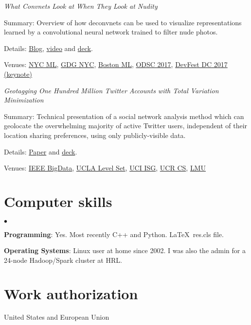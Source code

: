 \documentclass[margin,line]{res}
\newenvironment{list1}{
  \begin{list}{\ding{113}}{%
      \setlength{\itemsep}{0.0in}
      \setlength{\parsep}{0in} \setlength{\parskip}{0in}
      \setlength{\topsep}{0in} \setlength{\partopsep}{0in}
      \setlength{\leftmargin}{0.17in}}}{\end{list}}
\newenvironment{list2}{
  \begin{list}{$\bullet$}{%
      \setlength{\itemsep}{0in}
      \setlength{\parsep}{0in} \setlength{\parskip}{0in}
      \setlength{\topsep}{0in} \setlength{\partopsep}{0in}
      \setlength{\leftmargin}{0.2in}}}{\end{list}}
\begin{document}
\begin{resume}
{\it What Convnets Look at When They Look at Nudity}
\begin{list1}
\item [] Summary: Overview of how deconvnets can be used to visualize representations learned by a convolutional neural network trained to filter nude photos.
\item [] Details: \href{http://blog.clarifai.com/what-convolutional-neural-networks-see-at-when-they-see-nudity/}{Blog}, \href{https://www.youtube.com/watch?v=dWgXPKMvxDg}{video} and \href{https://docs.google.com/presentation/d/14SNvMFqyqd3qlKvibc06GkB1lLmDutzcr04uJ_LnX4s/edit#slide=id.g1525123836_1_870}{deck}.
\item [] Venues: \href{https://www.meetup.com/NYC-Machine-Learning/events/235535192/}{NYC ML}, \href{https://www.meetup.com/gdgnyc/events/231372185/}{GDG NYC}, \href{https://www.meetup.com/bostonml/events/235419742/}{Boston ML}, \href{https://www.odsc.com/training/portfolio/convolutional-neural-networks-look-look-nudity}{ODSC 2017}, \href{http://www.devfestdc.org/speakers/ryan-compton/}{DevFest DC 2017 (keynote)}
\end{list1}

{\it Geotagging One Hundred Million Twitter Accounts with Total Variation Minimization}
\begin{list1}
\item [] Summary: Technical presentation of a social network analysis method which can geolocate the overwhelming majority of active Twitter users, independent of their location sharing preferences, using only publicly-visible data.
\item [] Details: \href{https://arxiv.org/abs/1404.7152}{Paper} and \href{http://ryancompton.net/assets/resume/geolocation_slides_2.pdf}{deck}.
\item [] Venues: \href{http://cci.drexel.edu/bigdata/bigdata2014/}{IEEE BigData}, \href{http://papyrus.math.ucla.edu/seminars/display.php?&id=831425}{UCLA Level Set}, \href{http://calendar.ics.uci.edu/event.php?calendar=1&category=&event=1386&date=2015-01-16}{UCI ISG}, \href{http://wwwcontent.cs.ucr.edu/department/eventlookup/491}{UCR CS}, \href{http://myweb.lmu.edu/yma/LMUMathSeminar.htm}{LMU}
\end{list1}


\section{\sc Computer skills}
\begin{list2}
\item[]{\bf Programming}: Yes. Most recently C++ and Python. \LaTeX\ res.cls file.
\item[]{\bf Operating Systems}: Linux user at home since 2002. I was also the admin for a 24-node Hadoop/Spark cluster at HRL.
\end{list2}

\section{\sc Work authorization}
United States and European Union

\end{resume}
\end{document}
